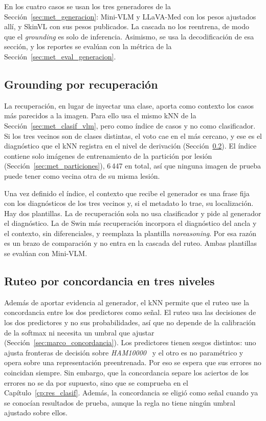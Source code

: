 En los cuatro casos se usan los tres generadores de la Sección~\ref{sec:met_generacion}: Mini-VLM y LLaVA-Med con los
pesos ajustados allí, y SkinVL con sus pesos publicados. La cascada no los reentrena, de modo que el \emph{grounding} es
solo de inferencia. Asimismo, se usa la decodificación de esa sección, y los reportes se evalúan con la métrica de la
Sección~\ref{sec:met_eval_generacion}.

\subsection{Grounding por recuperación}
\label{sec:met_recuperacion}

La recuperación, en lugar de inyectar una clase, aporta como contexto los casos más parecidos a la imagen. Para ello
usa el mismo kNN de la Sección~\ref{sec:met_clasif_vlm}, pero como índice de casos y no como clasificador. Si los tres
vecinos son de clases distintas, el voto cae en el más cercano, y ese es el diagnóstico que el kNN
registra en el nivel de derivación (Sección~\ref{sec:met_ruteo}). El índice contiene solo imágenes de entrenamiento de la
partición por lesión (Sección~\ref{sec:met_particiones}), 6\,447 en total, así que ninguna imagen de prueba puede
tener como vecina otra de su misma lesión.

Una vez definido el índice, el contexto que recibe el generador es una frase fija con los diagnósticos de los tres
vecinos y, si el metadato lo trae, su localización. Hay dos plantillas. La de recuperación sola no usa clasificador y pide al generador el
diagnóstico. La de Swin más recuperación incorpora el diagnóstico del ancla y el contexto, sin diferenciales, y
reemplaza la plantilla \emph{noreasoning}. Por esa razón es un brazo de comparación y no entra en la cascada del ruteo.
Ambas plantillas se evalúan con Mini-VLM.

\subsection{Ruteo por concordancia en tres niveles}
\label{sec:met_ruteo}

Además de aportar evidencia al generador, el kNN permite que el ruteo use la concordancia entre los dos predictores
como señal. El ruteo usa las decisiones de los dos predictores y no sus probabilidades, así que no depende de la calibración de la softmax ni
necesita un umbral que ajustar (Sección~\ref{sec:marco_concordancia}). Los predictores tienen sesgos distintos: uno
ajusta fronteras de decisión sobre \emph{HAM10000}~\cite{tschandl2018ham10000} y el otro es no paramétrico y opera sobre una
representación preentrenada. Por eso se espera que sus errores no coincidan siempre. Sin embargo, que la concordancia
separe los aciertos de los errores no se da por supuesto, sino que se comprueba en el Capítulo~\ref{cp:res_clasif}.
Además, la concordancia se eligió como señal cuando ya se conocían resultados de prueba, aunque la regla no tiene
ningún umbral ajustado sobre ellos.

